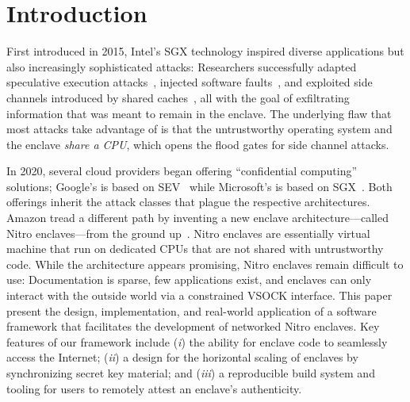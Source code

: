 \section{Introduction}

First introduced in 2015, Intel's SGX technology inspired diverse applications
but also increasingly sophisticated attacks: Researchers successfully adapted
speculative execution attacks~\cite{VanBulck2018a}, injected software
faults~\cite{Murdock2020a}, and exploited side channels introduced by shared
caches~\cite{Brasser2017a}, all with the goal of exfiltrating information that
was meant to remain in the enclave.  The underlying flaw that most attacks take
advantage of is that the untrustworthy operating system and the enclave
\emph{share a CPU}, which opens the flood gates for side channel attacks.

In 2020, several cloud providers began offering ``confidential computing''
solutions; Google's is based on SEV~\cite{googlecc} while Microsoft's is based
on SGX~\cite{azurecc}.  Both offerings inherit the attack classes that plague
the respective architectures.  Amazon tread a different path by inventing a new
enclave architecture---called Nitro enclaves---from the ground
up~\cite{nitro-enclaves}.  Nitro enclaves are essentially virtual machine that
run on dedicated CPUs that are not shared with untrustworthy code.  While the
architecture appears promising, Nitro enclaves remain difficult to use:
Documentation is sparse, few applications exist, and enclaves can only interact
with the outside world via a constrained VSOCK interface.  This paper present
the design, implementation, and real-world application of a software framework
that facilitates the development of networked Nitro enclaves.  Key features of
our framework include
(\emph{i}) the ability for enclave code to seamlessly access the Internet;
(\emph{ii}) a design for the horizontal scaling of enclaves by synchronizing
secret key material; and
(\emph{iii}) a reproducible build system and tooling for users to remotely
attest an enclave's authenticity.

